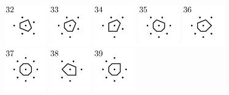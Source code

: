 \documentclass[text.tex]{subfiles}
\begin{document}
\begin{figure}[h!]
\includegraphics[width=0.16\textwidth]{img/results/circle8_concat/circle8_100000_(1_0alpha_1)_032.pdf}
\includegraphics[width=0.16\textwidth]{img/results/circle8_concat/circle8_100000_(1_0alpha_1)_033.pdf}
\includegraphics[width=0.16\textwidth]{img/results/circle8_concat/circle8_100000_(1_0alpha_1)_034.pdf}
\includegraphics[width=0.16\textwidth]{img/results/circle8_concat/circle8_100000_(1_0alpha_1)_035.pdf}
\includegraphics[width=0.16\textwidth]{img/results/circle8_concat/circle8_100000_(1_0alpha_1)_036.pdf}
\includegraphics[width=0.16\textwidth]{img/results/circle8_concat/circle8_100000_(1_0alpha_1)_037.pdf}
\includegraphics[width=0.16\textwidth]{img/results/circle8_concat/circle8_100000_(1_0alpha_1)_038.pdf}
\includegraphics[width=0.16\textwidth]{img/results/circle8_concat/circle8_100000_(1_0alpha_1)_039.pdf}

\end{figure}
\end{document}
